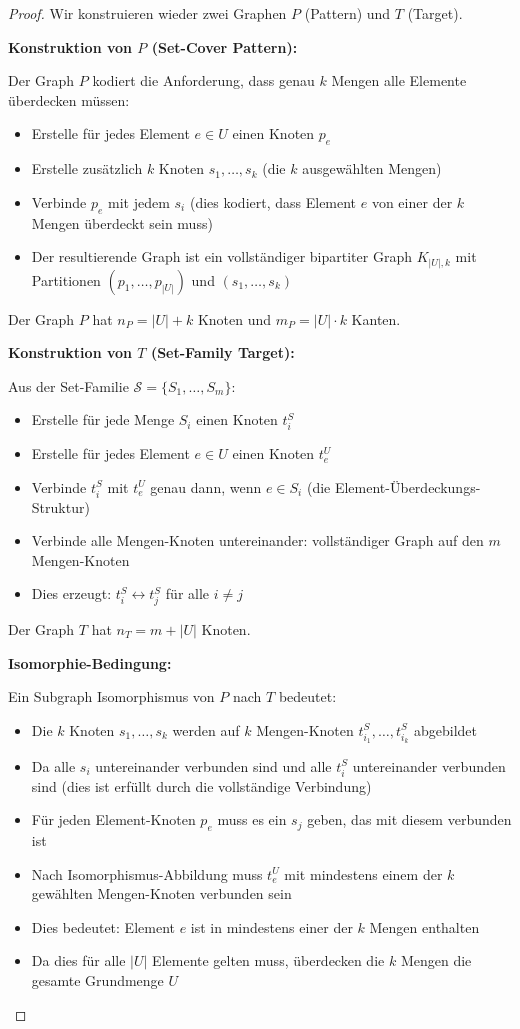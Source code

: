 ﻿\documentclass[a4paper,12pt]{article}
\theoremstyle{definition}
\begin{document}
\begin{proof}
	Wir konstruieren wieder zwei Graphen $P$ (Pattern) und $T$ (Target).
	
	\textbf{Konstruktion von $P$ (Set-Cover Pattern):}
	
	Der Graph $P$ kodiert die Anforderung, dass genau $k$ Mengen alle Elemente überdecken müssen:
	\begin{itemize}
		\item Erstelle für jedes Element $e \in U$ einen Knoten $p_e$
		\item Erstelle zusätzlich $k$ Knoten $s_1, \ldots, s_k$ (die $k$ ausgewählten Mengen)
		\item Verbinde $p_e$ mit jedem $s_i$ (dies kodiert, dass Element $e$ von einer der $k$ Mengen überdeckt sein muss)
		\item Der resultierende Graph ist ein vollständiger bipartiter Graph $K_{|U|, k}$ mit Partitionen $(p_1, \ldots, p_{|U|})$ und $(s_1, \ldots, s_k)$
	\end{itemize}
	
	Der Graph $P$ hat $n_P = |U| + k$ Knoten und $m_P = |U| \cdot k$ Kanten.
	
	\textbf{Konstruktion von $T$ (Set-Family Target):}
	
	Aus der Set-Familie $\mathcal{S} = \{S_1, \ldots, S_m\}$:
	\begin{itemize}
		\item Erstelle für jede Menge $S_i$ einen Knoten $t_i^S$
		\item Erstelle für jedes Element $e \in U$ einen Knoten $t_e^U$
		\item Verbinde $t_i^S$ mit $t_e^U$ genau dann, wenn $e \in S_i$ (die Element-Überdeckungs-Struktur)
		\item Verbinde alle Mengen-Knoten untereinander: vollständiger Graph auf den $m$ Mengen-Knoten
		\item Dies erzeugt: $t_i^S \leftrightarrow t_j^S$ für alle $i \neq j$
	\end{itemize}
	
	Der Graph $T$ hat $n_T = m + |U|$ Knoten.
	
	\textbf{Isomorphie-Bedingung:}
	
	Ein Subgraph Isomorphismus von $P$ nach $T$ bedeutet:
	\begin{itemize}
		\item Die $k$ Knoten $s_1, \ldots, s_k$ werden auf $k$ Mengen-Knoten $t_{i_1}^S, \ldots, t_{i_k}^S$ abgebildet
		\item Da alle $s_i$ untereinander verbunden sind und alle $t_i^S$ untereinander verbunden sind (dies ist erfüllt durch die vollständige Verbindung)
		\item Für jeden Element-Knoten $p_e$ muss es ein $s_j$ geben, das mit diesem verbunden ist
		\item Nach Isomorphismus-Abbildung muss $t_e^U$ mit mindestens einem der $k$ gewählten Mengen-Knoten verbunden sein
		\item Dies bedeutet: Element $e$ ist in mindestens einer der $k$ Mengen enthalten
		\item Da dies für alle $|U|$ Elemente gelten muss, überdecken die $k$ Mengen die gesamte Grundmenge $U$
	\end{itemize}
	

\end{proof}
\end{document}
